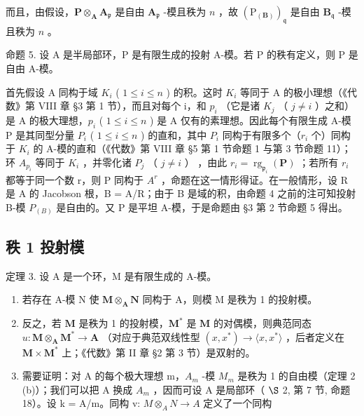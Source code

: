 而且，由假设，\(\mathbf{P} \otimes_{\mathbf{A}} \mathbf{A}_{\mathfrak{p}}\) 是自由 \(\mathbf{A}_{\mathfrak{p}}\) -模且秩为 \(n\) ，故 \((\mathrm{P}_{(\mathbf{B})})_{\mathfrak{q}}\) 是自由 \(\mathbf{B}_{\mathfrak{q}}\) -模且秩为 \(n\) 。

命题 5. 设 A 是半局部环，P 是有限生成的投射 A-模。若 P 的秩有定义，则 P 是自由 A-模。

首先假设 A 同构于域 \(K_{i}\) ( \(1 \leqslant i \leqslant n\) ) 的积。这时 \(K_{i}\) 等同于 A 的极小理想（《代数》第 VIII 章 §3 第 1 节），而且对每个 i，和 \(p_{i}\) （它是诸 \(K_{j}\) （ \(j \neq i\) ）之和）是 A 的极大理想，\(p_{i}\) ( \(1 \leqslant i \leqslant n\) ) 是 A 仅有的素理想。因此每个有限生成 A-模 P 是其同型分量 \(P_{i}\) ( \(1 \leqslant i \leqslant n\) ) 的直和，其中 \(P_{i}\) 同构于有限多个（\(r_{i}\) 个）同构于 \(K_{i}\) 的 A-模的直和（《代数》第 VIII 章 §5 第 1 节命题 1 与第 3 节命题 11）；环 \(A_{p_{i}}\) 等同于 \(K_{i}\) ，并零化诸 \(P_{j}\) （ \(j \neq i\) ） ，由此 \(r_{i} = \operatorname{rg}_{\mathfrak{p}_{i}}(\mathbf{P})\) ；若所有 \(r_{i}\) 都等于同一个数 r，则 P 同构于 \(A^{r}\) ，命题在这一情形得证。在一般情形，设 R 是 A 的 Jacobson 根，B = A/R；由于 B 是域的积，由命题 4 之前的注可知投射 B-模 \(P_{(B)}\) 是自由的。又 P 是平坦 A-模，于是命题由 §3 第 2 节命题 5 得出。

\subsection{秩 1 投射模}

定理 3. 设 A 是一个环，M 是有限生成的 A-模。

\begin{enumerate}
\def\labelenumi{(\roman{enumi})}
\item
  若存在 A-模 N 使 \(\mathbf{M} \otimes_{\mathbf{A}} \mathbf{N}\) 同构于 A，则模 M 是秩为 1 的投射模。
\item
  反之，若 \(\mathbf{M}\) 是秩为 1 的投射模，\(\mathbf{M}^*\) 是 \(\mathbf{M}\) 的对偶模，则典范同态 \(u: \mathbf{M} \otimes_{\mathbf{A}} \mathbf{M}^* \to \mathbf{A}\) （对应于典范双线性型 \((x, x^*) \to \langle x, x^* \rangle\) ，后者定义在 \(\mathbf{M} \times \mathbf{M}^*\) 上；《代数》第 II 章 §2 第 3 节）是双射的。
\item
  需要证明：对 A 的每个极大理想 m，\(A_{m}\) -模 \(M_{m}\) 是秩为 1 的自由模（定理 2 (b)）；我们可以把 A 换成 \(A_{m}\) ，因而可设 A 是局部环（ \(\S\) 2, 第 7 节, 命题 18）。设 k = A/m。同构 v: \(M \otimes_{A} N \to A\) 定义了一个同构
\end{enumerate}

